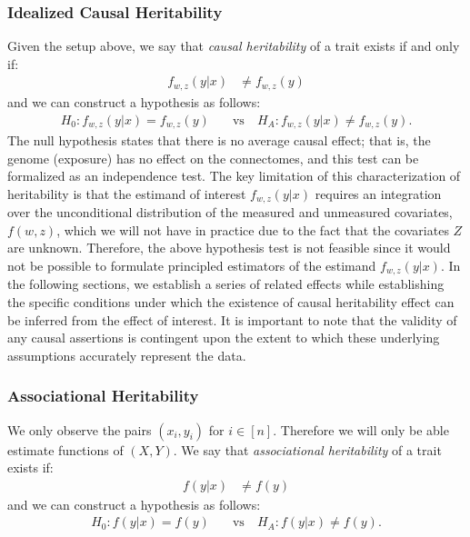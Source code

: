 \subsubsection{Idealized Causal Heritability}
Given the setup above, we say that \textit{causal heritability} of a trait exists if and only if:
\begin{align}
    f_{w, z}(y|x) &\neq f_{w, z}(y)\label{defn:causal_heritability}
\end{align}
and we can construct a hypothesis as follows:
\begin{align}
    H_0: f_{w, z}(y|x) = f_{w, z}(y) \quad &\text{vs} \quad 
    H_A: f_{w, z}(y|x) \neq f_{w, z}(y).
    \label{eq:causal-hypothesis}
\end{align}
The null hypothesis states that there is no average causal effect; that is, the genome (exposure) has no effect on the connectomes, and this test can be formalized as an independence test.
The key limitation of this characterization of heritability is that the estimand of interest $f_{w, z}(y|x)$ requires an integration over the unconditional distribution of the measured and unmeasured covariates, $f(w, z)$, which we will not have in practice due to the fact that the covariates $Z$ are unknown. Therefore, the above hypothesis test is not feasible since it would not be possible to formulate principled estimators of the estimand $f_{w, z}(y|x)$. In the following sections, we establish a series of related effects while establishing the specific conditions under which the existence of causal heritability effect can be inferred from the effect of interest. It is important to note that the validity of any causal assertions is contingent upon the extent to which these underlying assumptions accurately represent the data.

\subsubsection{Associational Heritability} \label{sec:ass-effect}
We only observe the pairs $(x_i, y_i)$ for $i \in [n]$. Therefore we will only be able estimate functions of $(X,Y)$. We say that \textit{associational heritability} of a trait exists if:
\begin{align*} \label{eq:ass}
    f(y|x) &\neq f(y)
\end{align*}
and we can construct a hypothesis as follows:
\begin{align}
    H_0: f(y|x) = f(y) \quad &\text{vs} \quad 
    H_A: f(y|x) \neq f(y).\label{eq:ass_hypothesis}
\end{align}

